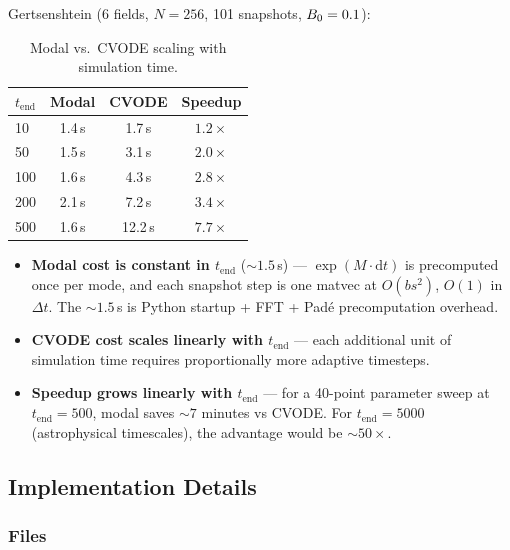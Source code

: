 Gertsenshtein (6 fields, $N=256$, 101 snapshots, $B_0=0.1$):

\begin{table}[htbp]
\centering
\caption{Modal vs.\ CVODE scaling with simulation time.}
\label{tab:modal-scaling-tend}
\begin{tabular}{@{}lccc@{}}
\toprule
$t_\text{end}$ & Modal & CVODE & Speedup \\
\midrule
10  & 1.4\,s & 1.7\,s  & $\mathbf{1.2\times}$ \\
50  & 1.5\,s & 3.1\,s  & $\mathbf{2.0\times}$ \\
100 & 1.6\,s & 4.3\,s  & $\mathbf{2.8\times}$ \\
200 & 2.1\,s & 7.2\,s  & $\mathbf{3.4\times}$ \\
500 & 1.6\,s & 12.2\,s & $\mathbf{7.7\times}$ \\
\bottomrule
\end{tabular}
\end{table}

\begin{itemize}
  \item \textbf{Modal cost is constant in $t_\text{end}$} (${\sim}1.5$\,s) --- $\exp(M \cdot \mathrm{d}t)$ is precomputed once per mode, and each snapshot step is one matvec at $O(bs^2)$, $O(1)$ in $\Delta t$. The ${\sim}1.5$\,s is Python startup + FFT + Pad\'{e} precomputation overhead.
  \item \textbf{CVODE cost scales linearly with $t_\text{end}$} --- each additional unit of simulation time requires proportionally more adaptive timesteps.
  \item \textbf{Speedup grows linearly with $t_\text{end}$} --- for a 40-point parameter sweep at $t_\text{end}=500$, modal saves ${\sim}7$ minutes vs CVODE. For $t_\text{end}=5000$ (astrophysical timescales), the advantage would be ${\sim}50\times$.
\end{itemize}

\subsection{Implementation Details}
\label{sec:modal-implementation}

\subsubsection{Files}
\label{sec:modal-files}

